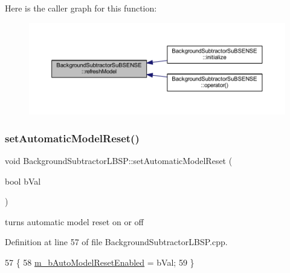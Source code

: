 Here is the caller graph for this function\+:\nopagebreak
\begin{figure}[H]
\begin{center}
\leavevmode
\includegraphics[width=350pt]{class_background_subtractor_su_b_s_e_n_s_e_abe80bf042f2b7a1f72942460d74b1f02_icgraph}
\end{center}
\end{figure}
\mbox{\label{class_background_subtractor_l_b_s_p_a31b8474f8b4ffa6ef08ec682cfcef9b0}} 
\subsubsection{\texorpdfstring{set\+Automatic\+Model\+Reset()}{setAutomaticModelReset()}}
{\footnotesize\ttfamily void Background\+Subtractor\+L\+B\+S\+P\+::set\+Automatic\+Model\+Reset (\begin{DoxyParamCaption}\item[{bool}]{b\+Val }\end{DoxyParamCaption})\hspace{0.3cm}{\ttfamily [inherited]}}



turns automatic model reset on or off 



Definition at line 57 of file Background\+Subtractor\+L\+B\+S\+P.\+cpp.


\begin{DoxyCode}
57                                                                \{
58     \mbox{\hyperlink{class_background_subtractor_l_b_s_p_a9d260f4e42e3fc79fb21af950ca9087a}{m\_bAutoModelResetEnabled}} = bVal;
59 \}
\end{DoxyCode}
\mbox{\label{class_background_subtractor_l_b_s_p_a34dc38d3d925d46d289c750786f232dc}} 
